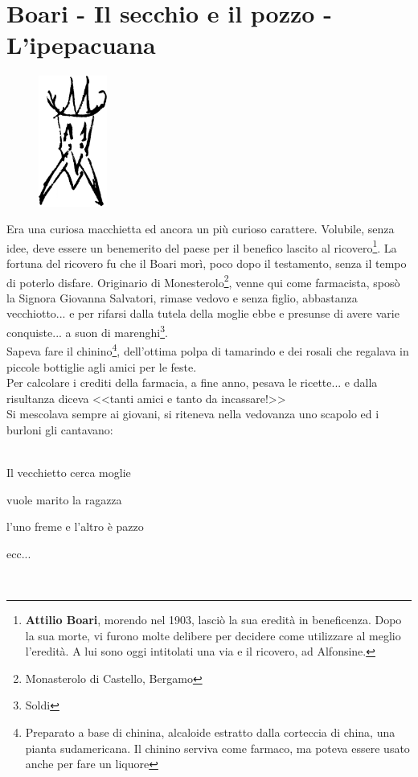 
\chapter{Boari - Il secchio e il pozzo - L'ipepacuana}
\begin{figure}
  \vspace{-1.2cm}
  \begin{center}
    \includegraphics[width=0.2\textwidth]{Boari}
  \end{center}
  \vspace{-0.5cm}
\end{figure}
Era una curiosa macchietta ed ancora un più curioso carattere. Volubile, senza idee, deve essere un benemerito del paese per il benefico lascito al ricovero\footnote{\textbf{Attilio Boari}, morendo nel 1903, lasciò la sua eredità in beneficenza. Dopo la sua morte, vi furono molte delibere per decidere come utilizzare al meglio l'eredità. A lui sono oggi intitolati una via e il ricovero, ad Alfonsine.}. La fortuna del ricovero fu che il Boari morì, poco dopo il testamento, senza il tempo di poterlo disfare. Originario di Monesterolo\footnote{Monasterolo di Castello, Bergamo}, venne qui come farmacista, sposò la Signora Giovanna Salvatori, rimase vedovo e senza figlio, abbastanza vecchiotto... e per rifarsi dalla tutela della moglie ebbe e presunse di avere varie conquiste... a suon di marenghi\footnote{Soldi}.\\
\indent Sapeva fare il chinino\footnote{Preparato a base di chinina, alcaloide estratto dalla corteccia di china, una pianta sudamericana. Il chinino serviva come farmaco, ma poteva essere usato anche per fare un liquore}, dell'ottima polpa di tamarindo e dei rosali che regalava in piccole bottiglie agli amici per le feste.\\
\indent Per calcolare i crediti della farmacia, a fine anno, pesava le ricette... e dalla risultanza diceva <<tanti amici e tanto da incassare!>>\\
\indent Si mescolava sempre ai giovani, si riteneva nella vedovanza uno scapolo ed i burloni gli cantavano:\\\\
\textcal \Huge
	\centerline{Il vecchietto cerca moglie}
	\centerline{vuole marito la ragazza}
	\centerline{l'uno freme e l'altro è pazzo}
	\centerline{ecc...}
\normalfont \normalsize\\

